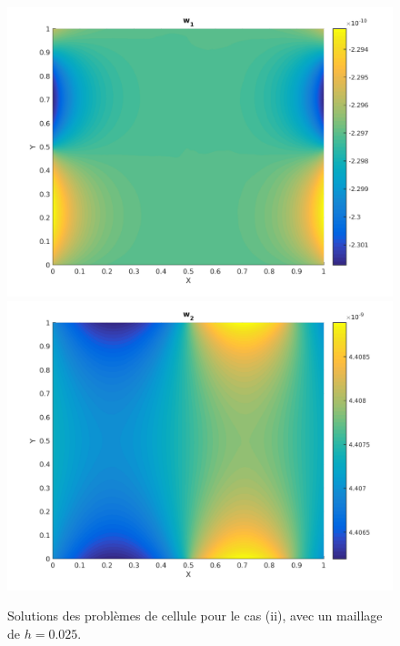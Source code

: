 \documentclass[11pt]{article}
\begin{document}
\begin{figure}
  \centering
  \includegraphics[height=.27\textheight]{SolutionPbHomogeneise/w1}
  \includegraphics[height=.27\textheight]{SolutionPbHomogeneise/w2} 
  \caption{Solutions des problèmes de cellule pour le cas (ii), avec un maillage de $h=0.025$.}
  \label{fig:sol_pbcell}
\end{figure}
\end{document}
